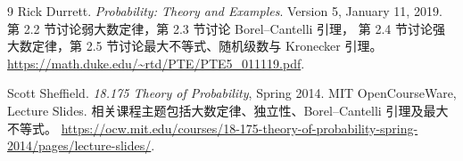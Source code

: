 \documentclass[UTF8]{ctexart}
\begin{document}
\begin{thebibliography}{9}
Rick Durrett.
\emph{Probability: Theory and Examples}.
Version 5, January 11, 2019.
第 2.2 节讨论弱大数定律，第 2.3 节讨论 Borel--Cantelli 引理，
第 2.4 节讨论强大数定律，第 2.5 节讨论最大不等式、随机级数与 Kronecker 引理。
\url{https://math.duke.edu/~rtd/PTE/PTE5_011119.pdf}.

Scott Sheffield.
\emph{18.175 Theory of Probability}, Spring 2014.
MIT OpenCourseWare, Lecture Slides.
相关课程主题包括大数定律、独立性、Borel--Cantelli 引理及最大不等式。
\url{https://ocw.mit.edu/courses/18-175-theory-of-probability-spring-2014/pages/lecture-slides/}.
\end{thebibliography}
\end{document}
